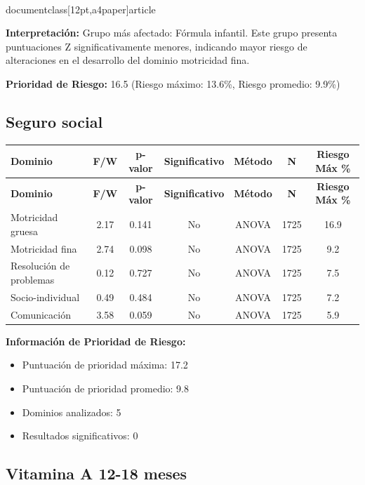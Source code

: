 \\documentclass[12pt,a4paper]{article}
\begin{document}
\textbf{Interpretación:} Grupo más afectado: Fórmula infantil. Este grupo presenta puntuaciones Z significativamente menores, indicando mayor riesgo de alteraciones en el desarrollo del dominio motricidad fina.

\textbf{Prioridad de Riesgo:} 16.5 (Riesgo máximo: 13.6\%, Riesgo promedio: 9.9\%)


\vspace{0.5cm}


\subsection{Seguro social}


\begin{longtable}{|l|c|c|c|c|c|c|}
\hline
\textbf{Dominio} & \textbf{F/W} & \textbf{p-valor} & \textbf{Significativo} & \textbf{Método} & \textbf{N} & \textbf{Riesgo Máx \%} \\
\hline
\endfirsthead

\hline
\textbf{Dominio} & \textbf{F/W} & \textbf{p-valor} & \textbf{Significativo} & \textbf{Método} & \textbf{N} & \textbf{Riesgo Máx \%} \\
\hline
\endhead

\hline
\endfoot

\hline
\endlastfoot

Motricidad gruesa & 2.17 & 0.141 & No & ANOVA & 1725 & 16.9 \\
Motricidad fina & 2.74 & 0.098 & No & ANOVA & 1725 & 9.2 \\
Resolución de problemas & 0.12 & 0.727 & No & ANOVA & 1725 & 7.5 \\
Socio-individual & 0.49 & 0.484 & No & ANOVA & 1725 & 7.2 \\
Comunicación & 3.58 & 0.059 & No & ANOVA & 1725 & 5.9 \\

\end{longtable}


\textbf{Información de Prioridad de Riesgo:}
\begin{itemize}
\item Puntuación de prioridad máxima: 17.2
\item Puntuación de prioridad promedio: 9.8
\item Dominios analizados: 5
\item Resultados significativos: 0
\end{itemize}


\subsection{Vitamina A 12-18 meses}
\end{document}
